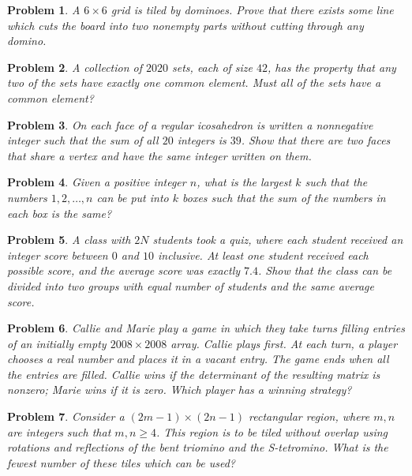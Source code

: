 \documentclass[12pt]{article}
\newtheorem{problem}{Problem}
\begin{document}
\begin{problem}
A $6 \times 6$ grid is tiled by dominoes. Prove that there exists some line which cuts the board into two nonempty parts without cutting through any domino.
\end{problem}

\begin{problem}
\textbf{\textcolor{red}{\heart}}
A collection of $2020$ sets, each of size $42$, has the property that any two of the sets have exactly one common element. Must all of the sets have a common element?
\end{problem}

\begin{problem}
On each face of a regular icosahedron is written a nonnegative integer such that the sum of all $20$ integers is $39$. Show that there are two faces that share a vertex and have the same integer written on them.
\end{problem}

\begin{problem}
Given a positive integer $n$, what is the largest $k$ such that the numbers $1, 2, \ldots, n$ can be put into $k$ boxes such that the sum of the numbers in each box is the same?
\end{problem}

\begin{problem}
\textbf{\textcolor{red}{\heart}}
A class with $2N$ students took a quiz, where each student received an integer score between $0$ and $10$ inclusive. At least one student received each possible score, and the average score was exactly $7.4$. Show that the class can be divided into two groups with equal number of students and the same average score.
\end{problem}

\begin{problem}
Callie and Marie play a game in which they take turns filling entries of an initially empty $2008 \times 2008$ array. Callie plays first. At each turn, a player chooses a real number and places it in a vacant entry. The game ends when all the entries are filled. Callie wins if the determinant of the resulting matrix is nonzero; Marie wins if it is zero. Which player has a winning strategy?
\end{problem}

\begin{problem}
Consider a $(2m-1) \times (2n-1)$ rectangular region, where $m, n$ are integers such that $m, n \geq 4$. This region is to be tiled without overlap using rotations and reflections of the bent triomino and the S-tetromino. What is the fewest number of these tiles which can be used?
\end{problem}
\end{document}
